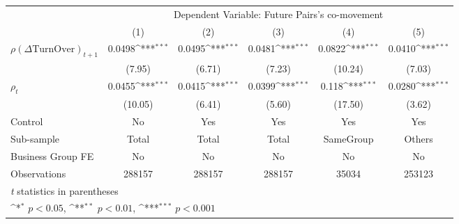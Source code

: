 {
\def\sym#1{\ifmmode^{#1}\else\(^{#1}\)\fi}
\begin{tabular}{l*{5}{c}}
\hline\hline
                &\multicolumn{5}{c}{Dependent Variable:  Future Pairs's co-movement}                           \\\cmidrule(lr){2-6}
                &\multicolumn{1}{c}{(1)}         &\multicolumn{1}{c}{(2)}         &\multicolumn{1}{c}{(3)}         &\multicolumn{1}{c}{(4)}         &\multicolumn{1}{c}{(5)}         \\
\hline
 $ {\rho(\Delta \text{TurnOver})_{t+1}} $ &   0.0498\sym{***}&   0.0495\sym{***}&   0.0481\sym{***}&   0.0822\sym{***}&   0.0410\sym{***}\\
                &   (7.95)         &   (6.71)         &   (7.23)         &  (10.24)         &   (7.03)         \\
[1em]
 $ {\rho_t} $   &   0.0455\sym{***}&   0.0415\sym{***}&   0.0399\sym{***}&    0.118\sym{***}&   0.0280\sym{***}\\
                &  (10.05)         &   (6.41)         &   (5.60)         &  (17.50)         &   (3.62)         \\
\hline
Control         &       No         &      Yes         &      Yes         &      Yes         &      Yes         \\
Sub-sample      &    Total         &    Total         &    Total         &SameGroup         &   Others         \\
Business Group FE&       No         &       No         &       No         &       No         &       No         \\
Observations    &   288157         &   288157         &   288157         &    35034         &   253123         \\
\hline\hline
\multicolumn{6}{l}{\footnotesize \textit{t} statistics in parentheses}\\
\multicolumn{6}{l}{\footnotesize \sym{*} \(p<0.05\), \sym{**} \(p<0.01\), \sym{***} \(p<0.001\)}\\
\end{tabular}
}
